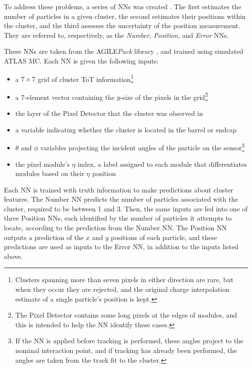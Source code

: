 To address these problems, a series of \acp{NN} was created \cite{PERF-2012-05}. The first estimates the number of particles in a given cluster, the second estimates their positions within the cluster, and the third assesses the uncertainty of the position measurement. They are referred to, respectively, as the \textit{Number}, \textit{Position}, and \textit{Error} \acp{NN}.

These \acp{NN} are taken from the AGILE\textit{Pack} library \cite{agile}, and trained using simulated \ac{ATLAS} \ac{MC}. Each \ac{NN} is given the following inputs: 
\begin{itemize}
\item a $7\times7$ grid of cluster \ac{ToT} information\footnote{Clusters spanning more than seven pixels in either direction are rare, but when they occur they are rejected, and the original charge interpolation estimate of a single particle's position is kept.}
\item a 7-element vector containing the $y$-size of the pixels in the grid\footnote{The Pixel Detector contains some long pixels at the edges of modules, and this is intended to help the \ac{NN} identify these cases.}
\item the layer of the Pixel Detector that the cluster was observed in
\item a variable indicating whether the cluster is located in the barrel or endcap
\item $\theta$ and $\phi$ variables projecting the incident angles of the particle on the sensor\footnote{If the \ac{NN} is applied before tracking is performed, these angles project to the nominal interaction point, and if tracking has already been performed, the angles are taken from the track fit to the cluster.}
\item the pixel module's $\eta$ index, a label assigned to each module that differentiates modules based on their $\eta$ position
\end{itemize}

Each \ac{NN} is trained with truth information to make predictions about cluster features. The Number \ac{NN} predicts the number of particles associated with the cluster, required to be between 1 and 3. Then, the same inputs are fed into one of three Position \acp{NN}, each identified by the number of particles it attempts to locate, according to the prediction from the Number \ac{NN}. The Position \ac{NN} outputs a prediction of the $x$ and $y$ positions of each particle, and these predictions are used as inputs to the Error \ac{NN}, in addition to the inputs listed above. 


